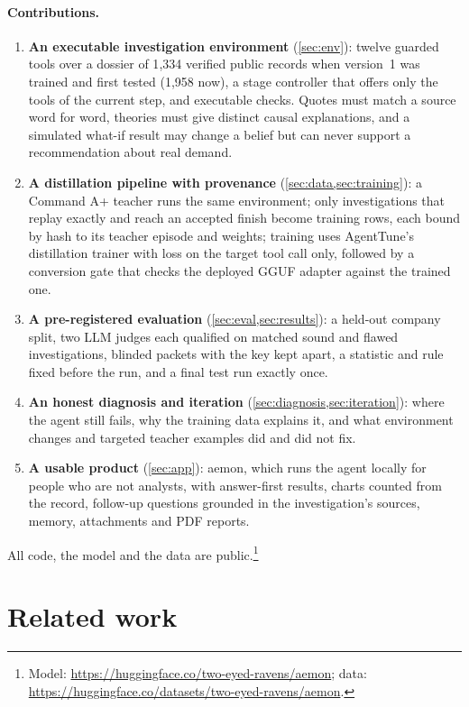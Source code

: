 \paragraph{Contributions.}
\begin{enumerate}
  \item \textbf{An executable investigation environment} (\cref{sec:env}): twelve guarded tools over a dossier of
        1{,}334 verified public records when version~1 was trained and first tested (1{,}958 now), a stage controller that offers only the tools of the current step, and
        executable checks. Quotes must match a source word for word, theories must give distinct causal explanations, and
        a simulated what-if result may change a belief but can never support a recommendation about real demand.
  \item \textbf{A distillation pipeline with provenance} (\cref{sec:data,sec:training}): a Command A+ teacher runs the
        same environment; only investigations that replay exactly and reach an accepted finish become training rows,
        each bound by hash to its teacher episode and weights; training uses AgentTune's distillation trainer with loss
        on the target tool call only, followed by a conversion gate that checks the deployed GGUF adapter against the
        trained one.
  \item \textbf{A pre-registered evaluation} (\cref{sec:eval,sec:results}): a held-out company split, two LLM judges
        each qualified on matched sound and flawed investigations, blinded packets with the key kept apart, a statistic
        and rule fixed before the run, and a final test run exactly once.
  \item \textbf{An honest diagnosis and iteration} (\cref{sec:diagnosis,sec:iteration}): where the agent still fails,
        why the training data explains it, and what environment changes and targeted teacher examples did and did not
        fix.
  \item \textbf{A usable product} (\cref{sec:app}): aemon, which runs the agent locally for people who are
        not analysts, with answer-first results, charts counted from the record, follow-up questions grounded in the
        investigation's sources, memory, attachments and PDF reports.
\end{enumerate}
All code, the model and the data are public.\footnote{Model:
\url{https://huggingface.co/two-eyed-ravens/aemon}; data:
\url{https://huggingface.co/datasets/two-eyed-ravens/aemon}.}

\section{Related work}\label{sec:related}
